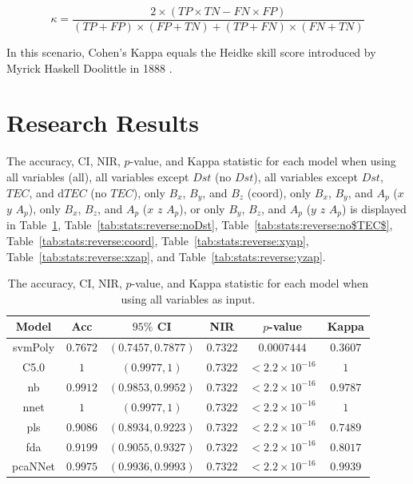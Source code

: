 \documentclass[sn-mathphys-num]{sn-jnl}%
\begin{document}
\begin{equation}
	\kappa ={\frac{2\times (TP\times TN-FN\times FP)}{(TP+FP)\times (FP+TN)+(TP+FN)\times (FN+TN)}}
	\label{eqn:25}
\end{equation}

In this scenario, Cohen's Kappa equals the Heidke skill score introduced by Myrick Haskell Doolittle in 1888 \cite{heidke1926berechnung, philosophical1887bulletin}.

\section{Research Results}
\label{sec:Results}

The accuracy, CI, NIR, $p$-value, and Kappa statistic for each model when using all variables (all), all variables except $Dst$ (no $Dst$), all variables except $Dst$, $TEC$, and d$TEC$ (no $TEC$), only $B_{x}$, $B_{y}$, and $B_{z}$ (coord), only $B_{x}$, $B_{y}$, and $A_{p}$ ($x$ $y$ $A_{p}$), only $B_{x}$, $B_{z}$, and $A_{p}$ ($x$ $z$ $A_{p}$), or only $B_{y}$, $B_{z}$, and $A_{p}$ ($y$ $z$ $A_{p}$) is displayed in Table~\ref{tab:stats:reverse:all}, Table~\ref{tab:stats:reverse:noDst}, Table~\ref{tab:stats:reverse:no$TEC$}, Table~\ref{tab:stats:reverse:coord}, Table~\ref{tab:stats:reverse:xyap}, Table~\ref{tab:stats:reverse:xzap}, and Table~\ref{tab:stats:reverse:yzap}.

\begin{table}[!ht]
    \centering
    \caption{The accuracy, CI, NIR, $p$-value, and Kappa statistic for each model when using all variables as input.}
	\label{tab:stats:reverse:all}
	\begin{tabular}{|c|c|c|c|c|c|}
		\hline
		Model & Acc & $95\%$ CI & NIR & $p$-value & Kappa \\ \hline
		svmPoly & $0.7672$ & $(0.7457, 0.7877)$ & $0.7322$ & $0.0007444$ & $0.3607$ \\ \hline
		C5.0 & $1$ & $(0.9977, 1)$ & $0.7322$ & $< 2.2 \times {10}^{-16}$ & $1$ \\ \hline
		nb & $0.9912$ & $(0.9853, 0.9952)$ & $0.7322$ & $< 2.2 \times {10}^{-16}$ & $0.9787$ \\ \hline
		nnet & $1$ & $(0.9977, 1)$ & $0.7322$ & $< 2.2 \times {10}^{-16}$ & $1$ \\ \hline
		pls & $0.9086$ & $(0.8934, 0.9223)$ & $0.7322$ & $< 2.2 \times {10}^{-16}$ & $0.7489$ \\ \hline
		fda & $0.9199$ & $(0.9055, 0.9327)$ & $0.7322$ & $< 2.2 \times {10}^{-16}$ & $0.8017$ \\ \hline
		pcaNNet & $0.9975$ & $(0.9936, 0.9993)$ & $0.7322$ & $< 2.2 \times {10}^{-16}$ & $0.9939$ \\ \hline
	\end{tabular}
\end{table}
\end{document}
